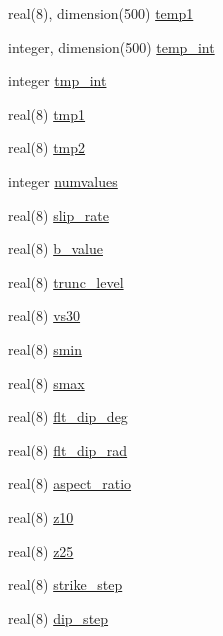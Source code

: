 \begin{DoxyCompactItemize}
\item 
real(8), dimension(500) \hyperlink{namespaceinput__module_a35e70ed5e2a0858cd4af8970e6b7a3fe}{temp1}
\item 
integer, dimension(500) \hyperlink{namespaceinput__module_a129d3471a7d48a92476195ec540b0599}{temp\+\_\+int}
\item 
integer \hyperlink{namespaceinput__module_a98528ea542cc829033364307335ecdf6}{tmp\+\_\+int}
\item 
real(8) \hyperlink{namespaceinput__module_a1030c19aa6f6f484e8f538320aa753b0}{tmp1}
\item 
real(8) \hyperlink{namespaceinput__module_a4344e7e8b58aa6d6e534cc25168867dc}{tmp2}
\item 
integer \hyperlink{namespaceinput__module_ae55e8966862c5748b17a68539c94a6f6}{numvalues}
\item 
real(8) \hyperlink{namespaceinput__module_a8c396f94a2d2aabe29bc5ba46c7c7fe0}{slip\+\_\+rate}
\item 
real(8) \hyperlink{namespaceinput__module_a44ab6716b820721bceea32b98883fcdd}{b\+\_\+value}
\item 
real(8) \hyperlink{namespaceinput__module_ae5dd4121bdb07e96089cd081a3017dd9}{trunc\+\_\+level}
\item 
real(8) \hyperlink{namespaceinput__module_a1c64f18e0ac52016bea961845fd4f11e}{vs30}
\item 
real(8) \hyperlink{namespaceinput__module_a29a8cb54fcb208499fa3cf1b30131619}{smin}
\item 
real(8) \hyperlink{namespaceinput__module_a671a995c1135b6127af4ea5a418402ed}{smax}
\item 
real(8) \hyperlink{namespaceinput__module_aab1c202e5a9b8804c86cf645932291d6}{flt\+\_\+dip\+\_\+deg}
\item 
real(8) \hyperlink{namespaceinput__module_a00a633afb5b4d59fbb59372da1b72dd5}{flt\+\_\+dip\+\_\+rad}
\item 
real(8) \hyperlink{namespaceinput__module_ab4d6a4549b55a71a3451143893707ad2}{aspect\+\_\+ratio}
\item 
real(8) \hyperlink{namespaceinput__module_aa9efcd8b3636531d8be863c73c607ba7}{z10}
\item 
real(8) \hyperlink{namespaceinput__module_a397fb4f34e05ebd010c3a545e29b8eb3}{z25}
\item 
real(8) \hyperlink{namespaceinput__module_aec362b5183a78823c9fd5604388f725e}{strike\+\_\+step}
\item 
real(8) \hyperlink{namespaceinput__module_a88d165b66edaf4e0dc9efbc76d5334b3}{dip\+\_\+step}

\end{DoxyCompactItemize}
